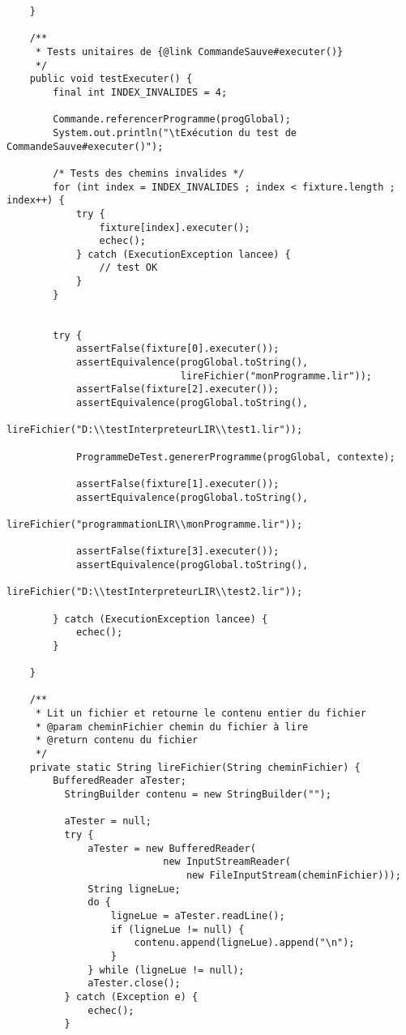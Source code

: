\begin{enum}
\begin{verbatim}
    }
    
    /**
     * Tests unitaires de {@link CommandeSauve#executer()}
     */
    public void testExecuter() {
        final int INDEX_INVALIDES = 4;
        
        Commande.referencerProgramme(progGlobal);
        System.out.println("\tExécution du test de CommandeSauve#executer()");
        
        /* Tests des chemins invalides */
        for (int index = INDEX_INVALIDES ; index < fixture.length ; index++) {
            try {
                fixture[index].executer();
                echec();
            } catch (ExecutionException lancee) {
                // test OK
            }
        }
        

        try {
            assertFalse(fixture[0].executer());
            assertEquivalence(progGlobal.toString(), 
                              lireFichier("monProgramme.lir"));
            assertFalse(fixture[2].executer());
            assertEquivalence(progGlobal.toString(), 
                    lireFichier("D:\\testInterpreteurLIR\\test1.lir"));
            
            ProgrammeDeTest.genererProgramme(progGlobal, contexte);
            
            assertFalse(fixture[1].executer());
            assertEquivalence(progGlobal.toString(), 
                    lireFichier("programmationLIR\\monProgramme.lir"));
            
            assertFalse(fixture[3].executer());
            assertEquivalence(progGlobal.toString(), 
                    lireFichier("D:\\testInterpreteurLIR\\test2.lir"));
            
        } catch (ExecutionException lancee) {
            echec();
        }

    }

    /**
     * Lit un fichier et retourne le contenu entier du fichier
     * @param cheminFichier chemin du fichier à lire
     * @return contenu du fichier
     */
    private static String lireFichier(String cheminFichier) {
        BufferedReader aTester;
          StringBuilder contenu = new StringBuilder("");
          
          aTester = null;
          try {
              aTester = new BufferedReader(
                           new InputStreamReader(
                               new FileInputStream(cheminFichier)));
              String ligneLue;
              do {
                  ligneLue = aTester.readLine();
                  if (ligneLue != null) {
                      contenu.append(ligneLue).append("\n");
                  }
              } while (ligneLue != null);
              aTester.close();
          } catch (Exception e) {
              echec();
          }
          

\end{verbatim}
\end{enum}
